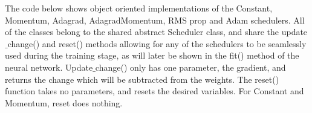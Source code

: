 \documentclass[%
oneside,                 %
final,                   %
10pt]{article}
\begin{document}
The code below shows object oriented implementations of the Constant,
Momentum, Adagrad, AdagradMomentum, RMS prop and Adam schedulers. All
of the classes belong to the shared abstract Scheduler class, and
share the update$\_$change() and reset() methods allowing for any of the
schedulers to be seamlessly used during the training stage, as will
later be shown in the fit() method of the neural
network. Update$\_$change() only has one parameter, the gradient, and returns the change which will be subtracted
from the weights. The reset() function takes no parameters, and resets
the desired variables. For Constant and Momentum, reset does nothing.
\end{document}
